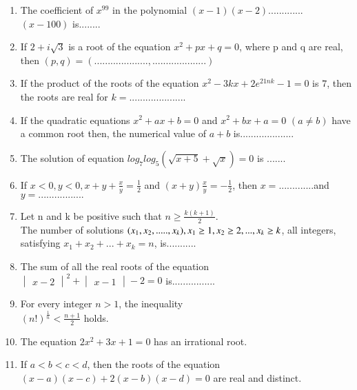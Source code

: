 \renewcommand{\theequation}{\theenumi}
\begin{enumerate}[label=\arabic*.,ref=\thesubsection.\theenumi]
\item The coefficient of $x^{99}$ in the polynomial
$(x-1)(x-2)$.............$(x-100)$ is........

\item If $2+i\sqrt{3}$ is a root of the equation
 $x^{2} +px+q=0$, where p and q are real, then
$(p,q)=(.................... , ....................)$

\item If the product of the roots of the equation
$x^{2}-3kx+2e^{21nk}-1=0$ is $7$, then the roots are real for
$k=.....................$

\item If the quadratic equations $x^{2} +ax+b=0$ and $x^{2}+bx+a=0$ $(a\neq b)$ have a common root then, the numerical value of $a+b$ is....................

\item The solution of equation
$log_7 log_5(\sqrt{x+5}+\sqrt{x})=0$ is .......

\item If $x<0,y<0,x+y+\frac{x} {y}=\frac{1}{2}$ and $(x+y)\frac{x}{y}=-\frac{1}{2}$, then $x=.............$and $y=.................$

\item Let n and k be positive such that $n\geq{\frac{k(k+1)}{2}}$.\\ The number of solutions $(x_1, x_2,.....,x_k), \\x_1\geq{1}, x_2\geq{2},...,x_k\geq{k}$, all integers, satisfying $x_1+x_2+...+x_k=n$, is...........

\item The sum of all the real roots of the equation\\$\begin{vmatrix} x-2 \end{vmatrix}^{2} + \begin{vmatrix} x-1 \end{vmatrix}-2 = 0$ is................

\item For every integer $n>1$, the inequality\\$(n!)^{\frac{1}{n}}<\frac{n+1}{2}$ holds.

\item The equation $2x^{2}+3x+1=0$ has an irrational root.

\item If $a<b<c<d$, then the roots of the equation\\
$(x-a)(x-c)+2(x-b)(x-d)=0$ are real and distinct.


\end{enumerate}
